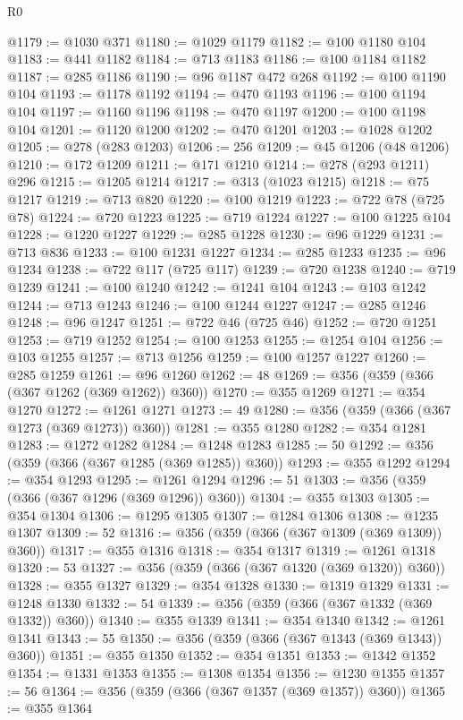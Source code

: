 \begin{lexlean}{R0}
\begin{coremodule}
@1179 := @1030 @371
@1180 := @1029 @1179
@1182 := @100 @1180 @104
@1183 := @441 @1182
@1184 := @713 @1183
@1186 := @100 @1184 @1182
@1187 := @285 @1186
@1190 := @96 @1187 @472 @268
@1192 := @100 @1190 @104
@1193 := @1178 @1192
@1194 := @470 @1193
@1196 := @100 @1194 @104
@1197 := @1160 @1196
@1198 := @470 @1197
@1200 := @100 @1198 @104
@1201 := @1120 @1200
@1202 := @470 @1201
@1203 := @1028 @1202
@1205 := @278 (@283 @1203)
@1206 := 256
@1209 := @45 @1206 (@48 @1206)
@1210 := @172 @1209
@1211 := @171 @1210
@1214 := @278 (@293 @1211) @296
@1215 := @1205 @1214
@1217 := @313 (@1023 @1215)
@1218 := @75 @1217
@1219 := @713 @820
@1220 := @100 @1219
@1223 := @722 @78 (@725 @78)
@1224 := @720 @1223
@1225 := @719 @1224
@1227 := @100 @1225 @104
@1228 := @1220 @1227
@1229 := @285 @1228
@1230 := @96 @1229
@1231 := @713 @836
@1233 := @100 @1231 @1227
@1234 := @285 @1233
@1235 := @96 @1234
@1238 := @722 @117 (@725 @117)
@1239 := @720 @1238
@1240 := @719 @1239
@1241 := @100 @1240
@1242 := @1241 @104
@1243 := @103 @1242
@1244 := @713 @1243
@1246 := @100 @1244 @1227
@1247 := @285 @1246
@1248 := @96 @1247
@1251 := @722 @46 (@725 @46)
@1252 := @720 @1251
@1253 := @719 @1252
@1254 := @100 @1253
@1255 := @1254 @104
@1256 := @103 @1255
@1257 := @713 @1256
@1259 := @100 @1257 @1227
@1260 := @285 @1259
@1261 := @96 @1260
@1262 := 48
@1269 := @356 (@359 (@366 (@367 @1262 (@369 @1262)) @360))
@1270 := @355 @1269
@1271 := @354 @1270
@1272 := @1261 @1271
@1273 := 49
@1280 := @356 (@359 (@366 (@367 @1273 (@369 @1273)) @360))
@1281 := @355 @1280
@1282 := @354 @1281
@1283 := @1272 @1282
@1284 := @1248 @1283
@1285 := 50
@1292 := @356 (@359 (@366 (@367 @1285 (@369 @1285)) @360))
@1293 := @355 @1292
@1294 := @354 @1293
@1295 := @1261 @1294
@1296 := 51
@1303 := @356 (@359 (@366 (@367 @1296 (@369 @1296)) @360))
@1304 := @355 @1303
@1305 := @354 @1304
@1306 := @1295 @1305
@1307 := @1284 @1306
@1308 := @1235 @1307
@1309 := 52
@1316 := @356 (@359 (@366 (@367 @1309 (@369 @1309)) @360))
@1317 := @355 @1316
@1318 := @354 @1317
@1319 := @1261 @1318
@1320 := 53
@1327 := @356 (@359 (@366 (@367 @1320 (@369 @1320)) @360))
@1328 := @355 @1327
@1329 := @354 @1328
@1330 := @1319 @1329
@1331 := @1248 @1330
@1332 := 54
@1339 := @356 (@359 (@366 (@367 @1332 (@369 @1332)) @360))
@1340 := @355 @1339
@1341 := @354 @1340
@1342 := @1261 @1341
@1343 := 55
@1350 := @356 (@359 (@366 (@367 @1343 (@369 @1343)) @360))
@1351 := @355 @1350
@1352 := @354 @1351
@1353 := @1342 @1352
@1354 := @1331 @1353
@1355 := @1308 @1354
@1356 := @1230 @1355
@1357 := 56
@1364 := @356 (@359 (@366 (@367 @1357 (@369 @1357)) @360))
@1365 := @355 @1364

\end{coremodule}
\end{lexlean}
